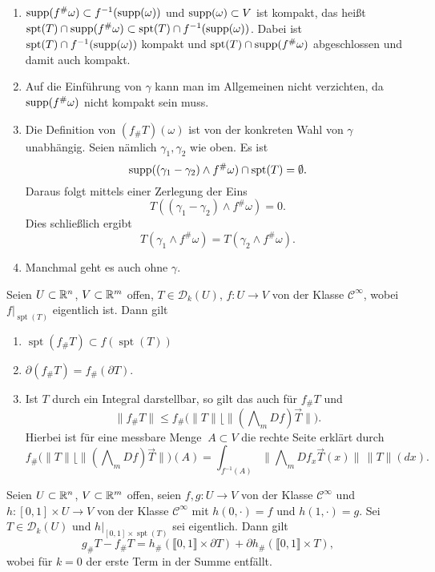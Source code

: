 \documentclass[a4paper,twoside,DIV15,BCOR12mm]{scrbook}
\newcommand{\bw}{\bigwedge\nolimits}
\DeclareMathOperator{\spt}{spt}
\newcommand{\MR}{\lfloor}
\newcommand{\overarrow}{\overrightarrow}
\begin{document}
\begin{bemerkungen}
\begin{enumerate}
\item $\mathop{\rm supp}\nolimits(f^\#\omega) \subset f^{-1}(\mathop{\rm supp}\nolimits(\omega))$ und $\mathop{\rm supp}\nolimits(\omega)\subset V$ ist kompakt, das heißt $\spt(T) \cap \supp(f^\#\omega) \subset \spt(T) \cap f^{-1}(\supp(\omega))$. Dabei ist $\spt(T) \cap f^{-1}(\supp(\omega))$ kompakt und $\spt(T) \cap \supp(f^\#\omega)$ abgeschlossen und damit auch kompakt.
\item Auf die Einführung von $\gamma$ kann man im Allgemeinen nicht verzichten, da $\mathop{\rm supp}\nolimits(f^\#\omega)$ nicht kompakt sein muss.
\item Die Definition von $(f_\#T)(\omega)$ ist von der konkreten Wahl von $\gamma$ unabhängig. Seien nämlich $\gamma_1,\gamma_2$ wie oben. Es ist
\[
\supp((\gamma_1-\gamma_2) \wedge f^\#\omega) \cap \spt(T) = \emptyset.
\]
Daraus folgt mittels einer Zerlegung der Eins
\[
T( (\gamma_1-\gamma_2) \wedge f^\# \omega) = 0.
\]
Dies schließlich ergibt 
\[
T( \gamma_1 \wedge f^\#\omega) = T(\gamma_2 \wedge f^\#\omega).
\]
\item Manchmal geht es auch ohne $\gamma$.
\end{enumerate}
\end{bemerkungen}

\begin{lemma}
\label{lem:4.16}Seien $U\subset \mathbb{R}^n$, $V\subset \mathbb{R}^m$ offen, $T\in\mathcal D_k(U)$, $f\colon U\to V$ von der Klasse $\mathcal C^\infty$, wobei $f|_{\spt(T)}$ eigentlich ist. Dann gilt
\begin{enumerate}
\item $\spt(f_\# T) \subset f(\spt(T))$
\item $\partial(f_\# T) = f_\#(\partial T)$.
\item Ist $T$ durch ein Integral darstellbar, so gilt das auch für $f_\# T$ und
\[
\| f_\# T\| \le f_\#\big(\|T\| \MR \|(\bw_m Df) \overarrow T\|\big).
\]
Hierbei ist für  eine messbare Menge $\ A\subset V$ die rechte Seite erklärt durch
$$
f_\#\big(\|T\| \MR \|(\bw_m Df) \overarrow T\|\big)(A)=\int_{f^{-1}(A)} \|\bw_m Df_x \overarrow T(x)\|\, \|T\|(dx).
$$
\end{enumerate}
\end{lemma}

\begin{satz}[Homotopieformel]
\label{satz:4.17}
Seien $U\subset\mathbb{R}^n$, $V\subset\mathbb{R}^m$ offen, seien $f,g\colon U\to V$ von der Klasse $\mathcal C^\infty$ und $h\colon [0,1]\times U\to V$ von der Klasse $\mathcal C^\infty$ mit $h(0,\cdot) = f$ und $h(1,\cdot) = g$. Sei $T\in\mathcal D_k(U)$ und $h|_{[0,1]\times \spt(T)}$ sei eigentlich. Dann gilt
\[
g_\# T - f_\# T = h_\#(\llbracket 0,1\rrbracket \times \partial T) + \partial h_\#(\llbracket 0,1\rrbracket \times T),
\]
wobei  für $k=0$ der erste Term in der Summe entfällt.
\end{satz}
\end{document}
